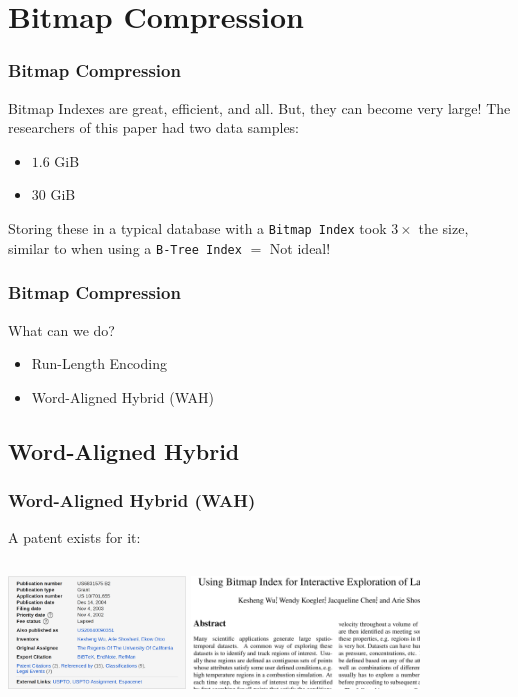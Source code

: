\documentclass[11pt]{beamer}
\begin{document}
\section[Bitmap Compression]{Bitmap Compression}
\begin{frame}
	\frametitle{Bitmap Compression}
	
	Bitmap Indexes are great, efficient, and all. But, they can become very large!
	\pause
	The researchers of this paper had two data samples:
	\begin{itemize}
		\pause
		\item $1.6$ GiB
		\pause
		\item $30$ GiB
	\end{itemize}
	
	\pause
	Storing these in a typical database with a \texttt{Bitmap Index} took $3\times$ the size, similar to when using a \texttt{B-Tree Index} \pause $=$ Not ideal!
\end{frame}

\begin{frame}
	\frametitle{Bitmap Compression}
	
	What can we do?
	\begin{itemize}
		\pause
		\item Run-Length Encoding
		\pause
		\item Word-Aligned Hybrid (WAH)
	\end{itemize}
\end{frame}

\subsection[Word-Aligned Hybrid]{Word-Aligned Hybrid}
\begin{frame}
	\frametitle{Word-Aligned Hybrid (WAH)}
	
	A patent exists for it:
	\begin{columns}[c]
		\column{4cm}
		\includegraphics[height=3cm]{patent.png}\footnotemark
		\column{6cm}
		\pause
		\includegraphics[height=3cm]{paper2.png}\footnotemark
	\end{columns}
	
\end{frame}
\end{document}
